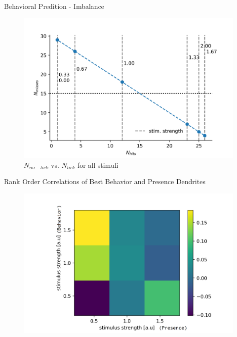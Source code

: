 \documentclass[10pt]{beamer}
\begin{document}
\begin{frame}[fragile]{Behavioral Predition - Imbalance}
\begin{center}
	\begin{figure}
	  \caption*{$N_{no-lick}$ vs. $N_{lick}$ for all stimuli}
      \includegraphics[width=1.0\textwidth]{fraction.png}
	\end{figure}
	\end{center}
\end{frame}


\begin{frame}[fragile]{Rank Order Correlations of Best Behavior and Presence Dendrites}
\begin{center}
	\begin{figure}
      \includegraphics[width=1.0\textwidth]{tranksrank_3x3.png}
	\end{figure}
	\end{center}
\end{frame}
\end{document}
